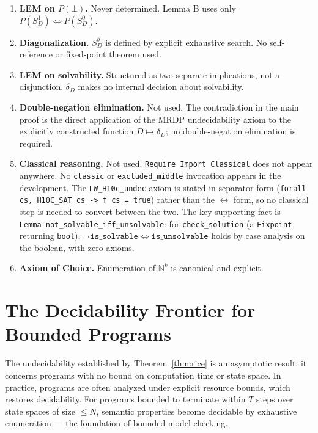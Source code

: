 \documentclass{lmcs}
\begin{document}
\begin{enumerate}[label=(\roman*)]
  \item \textbf{LEM on $P(\bot)$.} Never determined. Lemma B uses only
        $P(S_D^1) \Leftrightarrow P(S_D^0)$.
  \item \textbf{Diagonalization.} $S_D^b$ is defined by explicit exhaustive
        search. No self-reference or fixed-point theorem used.
  \item \textbf{LEM on solvability.} Structured as two separate implications,
        not a disjunction. $\delta_D$ makes no internal decision about
        solvability.
  \item \textbf{Double-negation elimination.} Not used. The contradiction
        in the main proof is the direct application of the MRDP
        undecidability axiom to the explicitly constructed function
        $D \mapsto \delta_D$; no double-negation elimination is required.
  \item \textbf{Classical reasoning.} Not used.  \texttt{Require Import
        Classical} does not appear anywhere. No \texttt{classic} or
        \texttt{excluded\_middle} invocation appears in the development.
        The \texttt{LW\_H10c\_undec} axiom is stated in separator form
        (\texttt{forall cs, H10C\_SAT cs -> f cs = true}) rather than
        the $\leftrightarrow$ form, so no classical step is needed to
        convert between the two. The key supporting fact is
        \texttt{Lemma~not\_solvable\_iff\_unsolvable}: for
        \texttt{check\_solution} (a \texttt{Fixpoint} returning \texttt{bool}),
        $\neg\,\mathtt{is\_solvable} \Leftrightarrow \mathtt{is\_unsolvable}$
        holds by case analysis on the boolean, with zero axioms.
  \item \textbf{Axiom of Choice.} Enumeration of $\mathbb{N}^k$ is canonical
        and explicit.
\end{enumerate}

\section{The Decidability Frontier for Bounded Programs}
\label{sec:frontier}

The undecidability established by Theorem~\ref{thm:rice} is an asymptotic
result: it concerns programs with no bound on computation time or state space.
In practice, programs are often analyzed under explicit resource bounds, which
restores decidability. For programs bounded to terminate within $T$ steps over
state spaces of size $\leq N$, semantic properties become decidable by
exhaustive enumeration --- the foundation of bounded model checking.
\end{document}
